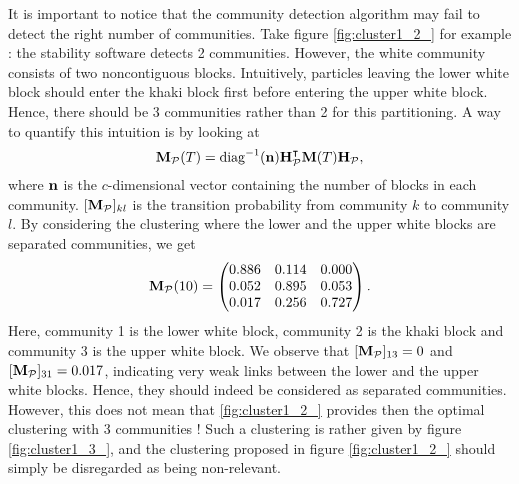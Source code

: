 It is important to notice that the community detection algorithm may fail to detect the right number of communities. Take figure \ref{fig:cluster1_2_} for example : the stability software detects 2 communities. However, the white community consists of two noncontiguous blocks. Intuitively, particles leaving the lower white block should enter the khaki block first before entering the upper white block. Hence, there should be 3 communities rather than 2 for this partitioning. A way to quantify this intuition is by looking at
\begin{equation}
	\mathbf M_{\mathcal{P}}(T) = \operatorname{diag}^{-1}(\mathbf n)\mathbf H^{\intercal}_{\mathcal{P}} \mathbf M(T) \mathbf H_{\mathcal{P}},
\end{equation}
where $\mathbf n$ is the $c$-dimensional vector containing the number of blocks in each community. $[\mathbf M_{\mathcal{P}}]_{kl}$ is the transition probability from community $k$ to community $l$. By considering the clustering where the lower and the upper white blocks are separated communities, we get
\begin{equation}
	\mathbf M_{\mathcal{P}}(10) = 
	\begin{pmatrix}
		0.886 & 0.114 & 0.000\\
	    0.052 & 0.895 & 0.053\\
	    0.017 & 0.256 & 0.727\\
    \end{pmatrix}.
\end{equation}
Here, community 1 is the lower white block, community 2 is the khaki block and community 3 is the upper white block. We observe that $[\mathbf M_{\mathcal{P}}]_{13} = 0$ and $[\mathbf M_{\mathcal{P}}]_{31} = 0.017$, indicating very weak links between the lower and the upper white blocks. Hence, they should indeed be considered as separated communities. However, this does not mean that \ref{fig:cluster1_2_} provides then the optimal clustering with 3 communities ! Such a clustering is rather given by figure \ref{fig:cluster1_3_}, and the clustering proposed in figure \ref{fig:cluster1_2_} should simply be disregarded as being non-relevant.

